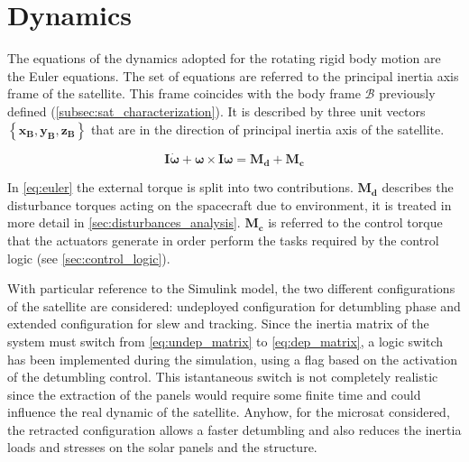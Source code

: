 \section{Dynamics}
\label{sec:dynamics}

The equations of the dynamics adopted for the rotating rigid body motion are the Euler equations. The set of equations are referred to the principal inertia axis frame of the satellite. This frame coincides with the body frame $\mathcal{B}$ previously defined (\autoref{subsec:sat_characterization}). It is described by three unit vectors $\left\{ \boldsymbol{x_B}, \boldsymbol{y_B}, \boldsymbol{z_B} \right\}$ that are in the direction of principal inertia axis of the satellite.

\begin{equation} \label{eq:euler}
    \boldsymbol{I \dot{\omega}} + \boldsymbol{\omega} \times \boldsymbol{I \omega} = \boldsymbol{M_d} + \boldsymbol{M_c}
\end{equation}

In \autoref{eq:euler} the external torque is split into two contributions.
$\boldsymbol{M_d}$ describes the disturbance torques acting on the spacecraft due to environment, it is treated in more detail in \autoref{sec:disturbances_analysis}.
$\boldsymbol{M_c}$ is referred to the control torque that the actuators generate in order perform the tasks required by the control logic (see \autoref{sec:control_logic}).

With particular reference to the Simulink model, the two different configurations of the satellite are considered: undeployed configuration for detumbling phase and extended configuration for slew and tracking. Since the inertia matrix of the system must switch from \autoref{eq:undep_matrix} to \autoref{eq:dep_matrix}, a logic switch has been implemented during the simulation, using a flag based on the activation of the detumbling control.
This istantaneous switch is not completely realistic since the extraction of the panels would require some finite time and could influence the real dynamic of the satellite. Anyhow, for the microsat considered, the retracted configuration allows a faster detumbling and also reduces the inertia loads and stresses on the solar panels and the structure.